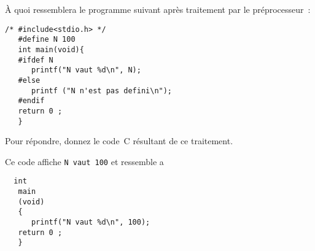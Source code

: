 \`A quoi ressemblera le programme suivant apr\`es traitement par le pr\'eprocesseur~:
\begin{verbatim}
/* #include<stdio.h> */
   #define N 100 
   int main(void){
   #ifdef N
      printf("N vaut %d\n", N);
   #else
      printf ("N n'est pas defini\n");
   #endif
   return 0 ;
   }
\end{verbatim}
Pour r\'epondre, donnez le code~C r\'esultant de ce traitement.
\ifcorrection
\par
Ce code affiche \verb+N vaut 100+ et ressemble a
\begin{verbatim}
  int
   main
   (void)
   {
      printf("N vaut %d\n", 100);
   return 0 ;
   }
\end{verbatim}
\fi
